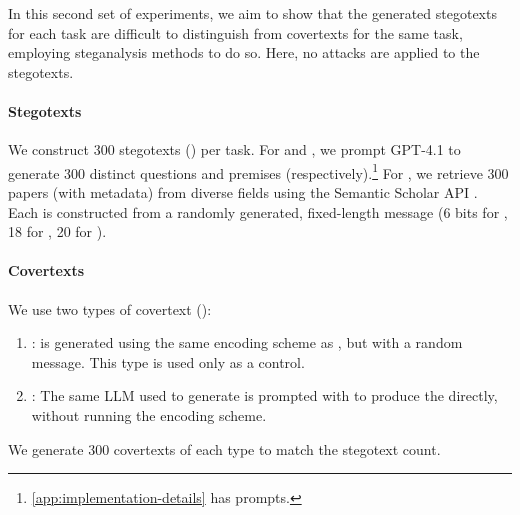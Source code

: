 In this second set of experiments, we aim to show that the generated stegotexts for each task are difficult to distinguish from covertexts for the same task, employing steganalysis methods to do so. Here, no attacks are applied to the stegotexts.

\paragraph{Stegotexts} We construct 300 stegotexts (\stegotext) per task. For \qa and \sg, we prompt GPT-4.1 to generate 300 distinct questions and premises (respectively).\footnote{\autoref{app:implementation-details} has prompts.} For \lr, we retrieve 300 papers (with metadata) from diverse fields using the Semantic Scholar API \citep{kinney2023semantic}. Each \stegotext is constructed from a randomly generated, fixed-length message \msg (6 bits for \qa, 18 for \sg, 20 for \lr).

\paragraph{Covertexts} We use two types of covertext (\covertext):
\begin{enumerate}[itemsep=0pt,parsep=1pt]
    \item \typeone: \covertext is generated using the same encoding scheme as \stegotext, but with a random message. This type is used only as a control.
    \item \typetwo: The same LLM used to generate \stegotext is prompted with \inp to produce the \covertext directly, without running the encoding scheme.
\end{enumerate}
We generate 300 covertexts of each type to match the stegotext count.



